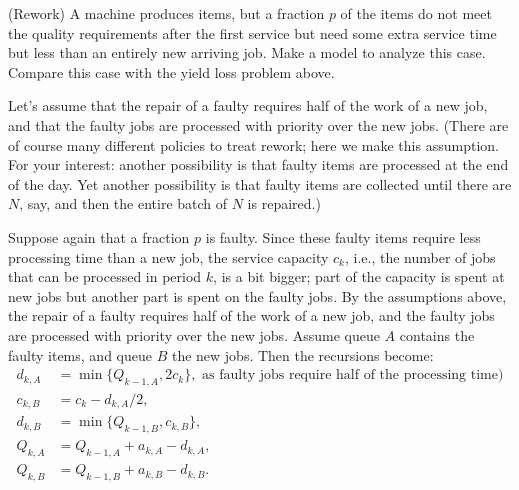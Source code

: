 \begin{question}
  (Rework) A machine produces items, but a fraction $p$ of the items
  do not meet the quality requirements after the first service but
  need some extra service time but less than an entirely new arriving
  job. Make a model to analyze this case. Compare this case with the
  yield loss problem above. 

  Let's assume that the repair of a faulty requires half of the work
  of a new job, and that the faulty jobs are processed with priority
  over the new jobs. (There are of course many different policies to
  treat rework; here we make this assumption. For your interest:
  another possibility is that faulty items are processed at the end of
  the day. Yet another possibility is that faulty items are collected
  until there are $N$, say, and then the entire batch of $N$ is
  repaired.)

  \begin{solution}
    Suppose again that a fraction $p$ is faulty. Since these faulty
    items require less processing time than a new job, the service
    capacity $c_k$, i.e., the number of jobs that can be processed in
    period $k$, is a bit bigger; part of the capacity is spent at new
    jobs but another part is spent on the faulty jobs. By the
    assumptions above, the repair of a faulty requires half of the
    work of a new job, and the faulty jobs are processed with priority
    over the new jobs. Assume queue $A$ contains the faulty items, and
    queue $B$ the new jobs. Then the recursions become:
\begin{equation*}
  \begin{split}
    d_{k,A} &= \min\{Q_{k-1, A}, 2c_k\}, \text{ as faulty jobs require half of the processing time})\\
    c_{k,B} &= c_k - d_{k,A}/2, \\
    d_{k,B} &= \min\{Q_{k-1, B}, c_{k,B}\}, \\
    Q_{k,A} &= Q_{k-1, A} + a_{k,A} - d_{k,A}, \\
    Q_{k,B} &= Q_{k-1, B} + a_{k,B} - d_{k,B}.
  \end{split}
\end{equation*}

  \end{solution}
\end{question}


